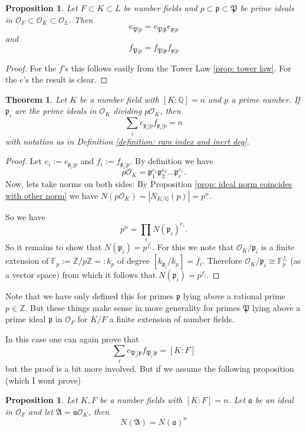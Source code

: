 \documentclass[11pt,a4paper]{report}
\theoremstyle{plain}
\newtheorem{thm}[subsection]{Theorem}
\newtheorem{prop}[subsection]{Proposition}
\theoremstyle{definition}
\theoremstyle{definition}
\newcommand{\ZZ}{\mathbb{Z}}
\def\FF{\mathbb{F}}
\def\QQ{\mathbb{Q}}
\def \gothP{\mathfrak{P}}
\def\gothp{\mathfrak{p}}
\def \OO {\mathcal{O}}
\def\gotha{\mathfrak{a}}
\begin{document}
	\begin{prop}\label{prop: tow law for ram rel}
		Let $F \subset K \subset L$ be number fields and $p \subset \gothp \subset \gothP$ be prime ideals in $\OO_F \subset \OO_K \subset \OO_L$. Then
		\[e_{\gothP|p}=e_{\gothP|\gothp}e_{\gothp|p} \] and 	\[f_{\gothP|p}=f_{\gothP|\gothp}f_{\gothp|p} \]
	\end{prop}
	
	\begin{proof}
		For the $f$'s this follows easily from the Tower Law \ref{prop: tower law}. For the $e$'s the result is clear.
	\end{proof}
	
	\begin{thm}\label{thm: ram-rel}
		Let $K$ be a number field with $[K:\QQ]=n$ and $p$ a prime number. If $\gothp_i$ are the prime ideals in $\OO_K$ dividing $p\OO_K$, then \[\sum_i e_{\gothp_i|p}f_{\gothp_i|p}=n\] with notation as in Definition \ref{definition: ram index and inert deg}.
	\end{thm}
	
	\begin{proof}
		Let $e_i:=e_{\gothp_i|p}$ and $f_i:=f_{\gothp_i|p}$. By definition we have \[p\OO_K=\gothp_1^{e_1}\gothp_2^{e_2}\dots\gothp_r^{e_r}.\] Now, lets take norms on both sides: By Proposition \ref{prop: ideal norm coincides with other norm} we have $N(p\OO_K)=|N_{K/\QQ}(p)|=p^n$.
		
		So we have  \[p^n=\prod_i N(\gothp_i)^{e_i}.\] So it remains to show that $N(\gothp_i)=p^{f_i}$. For this we note that $\OO_K/\gothp_i$ is a finite extension of $\FF_p:=\ZZ/p\ZZ=:k_p$ of degree $[k_{\gothp_i}/k_p]=f_i$. Therefore $\OO_K/\gothp_i \cong \FF_p^{f_i}$ (as a vector space) from which it follows that  $N(\gothp_i)=p^{f_i}$. 
	\end{proof}
	
	
	
	
	
	
	Note that we have only defined this for primes $\gothp$ lying above a rational prime $p \in \ZZ$. But these things make sense in more generality for primes $\gothP$  lying above a prime ideal $\gothp$ in $\OO_F$ for $K/F$ a finite extension of number fields. 
	
	In this case one can again prove that \begin{equation} \label{eqn: ram rel} \sum_i e_{\gothP_i|\gothp}f_{\gothP_i|\gothp}=[K:F] \end{equation} but the proof is a bit more involved. But if we assume the following proposition (which I wont prove)	
	\begin{prop}\label{prop: ideal norm in tower}
		Let $K,F$ be a number fields with $[K:F]=n$. Let $\mathfrak{a}$ be an ideal in $\OO_F$ and let $\mathfrak{A}=\gotha\OO_K$, then 
		\[N(\mathfrak{A})=N(\gotha)^n\]
	\end{prop}
	
\end{document}
